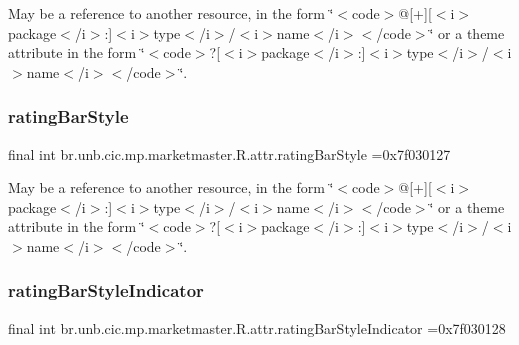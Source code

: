 May be a reference to another resource, in the form \char`\"{}$<$code$>$@\mbox{[}+\mbox{]}\mbox{[}$<$i$>$package$<$/i$>$\+:\mbox{]}$<$i$>$type$<$/i$>$/$<$i$>$name$<$/i$>$$<$/code$>$\char`\"{} or a theme attribute in the form \char`\"{}$<$code$>$?\mbox{[}$<$i$>$package$<$/i$>$\+:\mbox{]}$<$i$>$type$<$/i$>$/$<$i$>$name$<$/i$>$$<$/code$>$\char`\"{}. \mbox{\label{classbr_1_1unb_1_1cic_1_1mp_1_1marketmaster_1_1R_1_1attr_a54143ca85a329c2218befc2c025fb809}} 
\subsubsection{\texorpdfstring{rating\+Bar\+Style}{ratingBarStyle}}
{\footnotesize\ttfamily final int br.\+unb.\+cic.\+mp.\+marketmaster.\+R.\+attr.\+rating\+Bar\+Style =0x7f030127\hspace{0.3cm}{\ttfamily [static]}}

May be a reference to another resource, in the form \char`\"{}$<$code$>$@\mbox{[}+\mbox{]}\mbox{[}$<$i$>$package$<$/i$>$\+:\mbox{]}$<$i$>$type$<$/i$>$/$<$i$>$name$<$/i$>$$<$/code$>$\char`\"{} or a theme attribute in the form \char`\"{}$<$code$>$?\mbox{[}$<$i$>$package$<$/i$>$\+:\mbox{]}$<$i$>$type$<$/i$>$/$<$i$>$name$<$/i$>$$<$/code$>$\char`\"{}. \mbox{\label{classbr_1_1unb_1_1cic_1_1mp_1_1marketmaster_1_1R_1_1attr_a70b0850e89145a156c41ff41530fc79c}} 
\subsubsection{\texorpdfstring{rating\+Bar\+Style\+Indicator}{ratingBarStyleIndicator}}
{\footnotesize\ttfamily final int br.\+unb.\+cic.\+mp.\+marketmaster.\+R.\+attr.\+rating\+Bar\+Style\+Indicator =0x7f030128\hspace{0.3cm}{\ttfamily [static]}}

